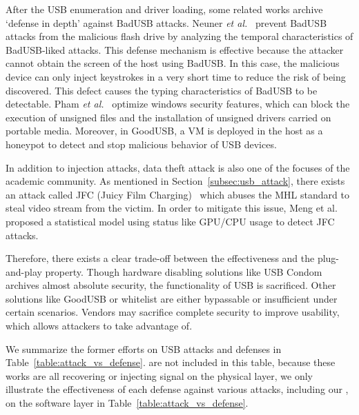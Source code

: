 After the USB enumeration and driver loading, some related works
archive `defense in depth'
against BadUSB attacks.  Neuner \emph{et al.}~\cite{neuner2018usblock}
prevent BadUSB attacks from the malicious flash drive by analyzing
the temporal characteristics of BadUSB-liked attacks. This defense mechanism is
effective because the attacker cannot obtain the screen of the host using
BadUSB. In this case, the malicious device can only inject keystrokes in a very
short time to reduce the risk of being discovered. This defect causes the
typing characteristics of BadUSB to be detectable. Pham \emph{et al.}~\cite{pham2010optimizing} optimize windows security features, which can
block the execution of unsigned files and the installation of unsigned drivers
carried on portable media. Moreover, in GoodUSB, a VM is deployed in the host as
a honeypot to detect and stop malicious behavior of USB devices.

In addition to injection attacks, data theft attack is also one of the focuses
of the academic community. As mentioned in Section~\ref{subsec:usb_attack}, there
exists an attack called JFC (Juicy Film Charging)~\cite{JFC} which abuses the MHL
standard to steal video stream from the victim. In order to mitigate this
issue, Meng et al.~\cite{meng2018252} proposed a statistical model using status
like GPU/CPU usage to detect JFC attacks.

Therefore, there exists a clear trade-off between the effectiveness and the
plug-and-play property. Though hardware disabling solutions like USB Condom
archives almost absolute security, the functionality of USB is sacrificed.
Other solutions like GoodUSB or whitelist are either bypassable or insufficient
under certain scenarios. Vendors may sacrifice complete security to
improve usability, which allows attackers to take advantage of.

We summarize the former efforts on USB attacks and defenses in
Table~\ref{table:attack_vs_defense}. \cite{usbkiller, cable,smartphone, poweremi,revealing,su2017usb, usbgpslocator, bates2014leveraging, badusbhub, usbfinger, side, usbdriver, usbee, turnip} are not included in this table, because these works are all recovering or injecting signal on the physical layer, we only illustrate the effectiveness of 
each defense against various attacks, including our \tool, on the software layer in Table~\ref{table:attack_vs_defense}. 

